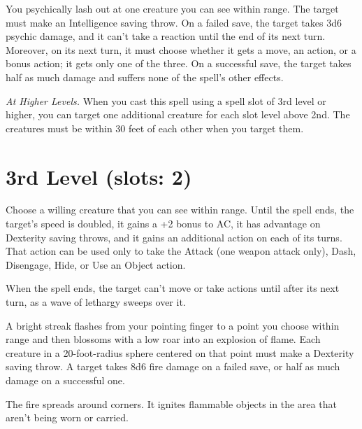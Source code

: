 \documentclass[letterpaper,twocolumn,openany,nodeprecatedcode,justified]{dndbook}
\begin{document}

You psychically lash out at one creature you can see within range. The target must make an Intelligence saving throw. On a failed save, the target takes 3d6 psychic damage, and it can't take a reaction until the end of its next turn. Moreover, on its next turn, it must choose whether it gets a move, an action, or a bonus action; it gets only one of the three. On a successful save, the target takes half as much damage and suffers none of the spell's other effects.

\emph{At Higher Levels.} When you cast this spell using a spell slot of 3rd level or higher, you can target one additional creature for each slot level above 2nd. The creatures must be within 30 feet of each other when you target them.

\section{3rd Level (slots: 2)}


Choose a willing creature that you can see within range. Until the spell ends, the target's speed is doubled, it gains a +2 bonus to AC, it has advantage on Dexterity saving throws, and it gains an additional action on each of its turns. That action can be used only to take the Attack (one weapon attack only), Dash, Disengage, Hide, or Use an Object action.

When the spell ends, the target can't move or take actions until after its next turn, as a wave of lethargy sweeps over it.


A bright streak flashes from your pointing finger to a point you choose within range and then blossoms with a low roar into an explosion of flame. Each creature in a 20-foot-radius sphere centered on that point must make a Dexterity saving throw. A target takes 8d6 fire damage on a failed save, or half as much damage on a successful one.

The fire spreads around corners. It ignites flammable objects in the area that aren't being worn or carried.
\end{document}
